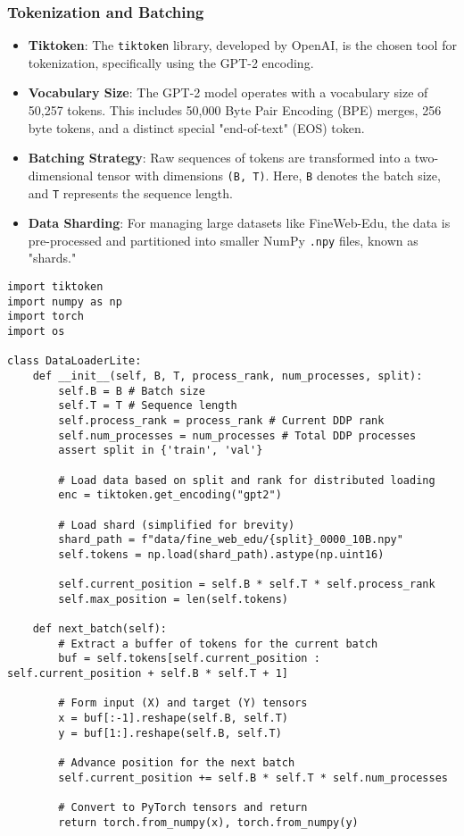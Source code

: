 \subsubsection{Tokenization and Batching}
\begin{itemize}
    \item \textbf{Tiktoken}: The \texttt{tiktoken} library, developed by OpenAI, is the chosen tool for tokenization, specifically using the GPT-2 encoding.
    \item \textbf{Vocabulary Size}: The GPT-2 model operates with a vocabulary size of 50,257 tokens. This includes 50,000 Byte Pair Encoding (BPE) merges, 256 byte tokens, and a distinct special "end-of-text" (EOS) token.
    \item \textbf{Batching Strategy}: Raw sequences of tokens are transformed into a two-dimensional tensor with dimensions \texttt{(B, T)}. Here, \texttt{B} denotes the batch size, and \texttt{T} represents the sequence length.
    \item \textbf{Data Sharding}: For managing large datasets like FineWeb-Edu, the data is pre-processed and partitioned into smaller NumPy \texttt{.npy} files, known as "shards."
\end{itemize}

\begin{lstlisting}[caption={Data Loader (Simplified)}]
import tiktoken
import numpy as np
import torch
import os

class DataLoaderLite:
    def __init__(self, B, T, process_rank, num_processes, split):
        self.B = B # Batch size
        self.T = T # Sequence length
        self.process_rank = process_rank # Current DDP rank
        self.num_processes = num_processes # Total DDP processes
        assert split in {'train', 'val'}

        # Load data based on split and rank for distributed loading
        enc = tiktoken.get_encoding("gpt2")
        
        # Load shard (simplified for brevity)
        shard_path = f"data/fine_web_edu/{split}_0000_10B.npy"
        self.tokens = np.load(shard_path).astype(np.uint16)
        
        self.current_position = self.B * self.T * self.process_rank
        self.max_position = len(self.tokens)

    def next_batch(self):
        # Extract a buffer of tokens for the current batch
        buf = self.tokens[self.current_position : self.current_position + self.B * self.T + 1]
        
        # Form input (X) and target (Y) tensors
        x = buf[:-1].reshape(self.B, self.T)
        y = buf[1:].reshape(self.B, self.T)

        # Advance position for the next batch
        self.current_position += self.B * self.T * self.num_processes

        # Convert to PyTorch tensors and return
        return torch.from_numpy(x), torch.from_numpy(y)
\end{lstlisting}


